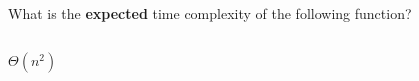 \begin{prob}
    What is the \textbf{expected} time complexity of the following function?

    \inputminted{python}{./code.py}

    \begin{soln}
        $\Theta(n^2)$
    \end{soln}

\end{prob}
